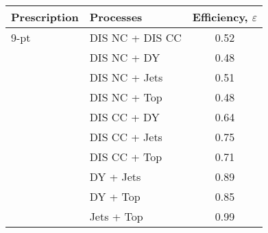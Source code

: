 \begin{tabular}{l|l|c}
Prescription & Processes & Efficiency, $\varepsilon$  \\
\hline
    9-pt & DIS NC + DIS CC & 0.52 \\
	& DIS NC + DY & 0.48 \\
	& DIS NC + Jets & 0.51 \\
	& DIS NC + Top & 0.48 \\
	& DIS CC + DY & 0.64 \\
	& DIS CC + Jets & 0.75 \\
	& DIS CC + Top & 0.71 \\
	& DY + Jets & 0.89 \\
	& DY + Top & 0.85 \\
	& Jets + Top & 0.99 \\
\end{tabular}
